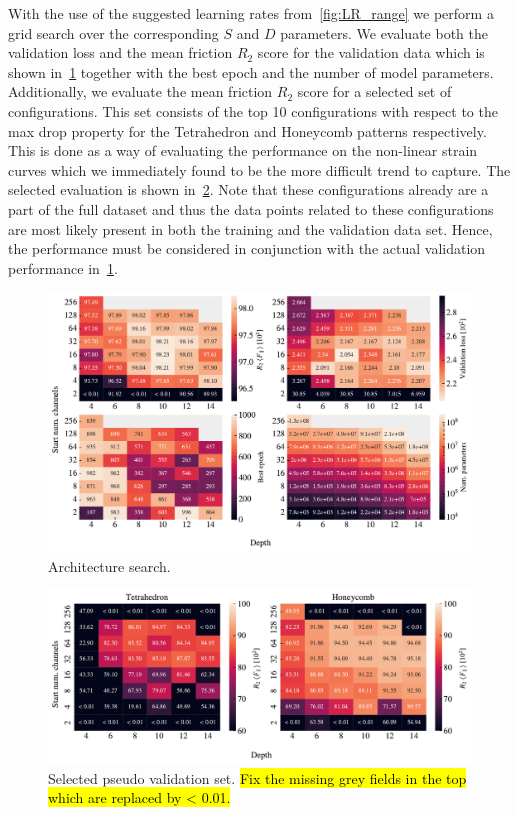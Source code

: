 With the use of the suggested learning rates from~\cref{fig:LR_range} we perform
a grid search over the corresponding $S$ and $D$ parameters. We evaluate both
the validation loss and the mean friction $R_2$ score for the validation data which is shown in~\cref{fig:A_search_perf} together with the best epoch and the number of model parameters. Additionally, we evaluate the mean friction $R_2$ score for a selected set of configurations. This set consists of the top 10 configurations with respect to the max drop property for the Tetrahedron and Honeycomb patterns respectively. This is done as a way of evaluating the performance on the non-linear strain curves which we immediately found to be the more difficult trend to capture. The selected evaluation is shown in~\cref{fig:A_search_compare}. Note that these configurations already are a part of the full dataset and thus the data points related to these configurations are most likely present in both the training and the validation data set. Hence, the performance must be considered in conjunction with the actual validation performance in~\cref{fig:A_search_perf}.

\begin{figure}[H]
  \centering
  \includegraphics[width=\linewidth]{figures/ML/A_search_perf.pdf}
  \caption{Architecture search.}
  \label{fig:A_search_perf}
\end{figure}  

\begin{figure}[H]
  \centering
  \includegraphics[width=\linewidth]{figures/ML/A_search_compare_perf}
  \caption{Selected pseudo validation set. \hl{Fix the missing grey fields in the top which are replaced by < 0.01.}}
  \label{fig:A_search_compare}
\end{figure}  

